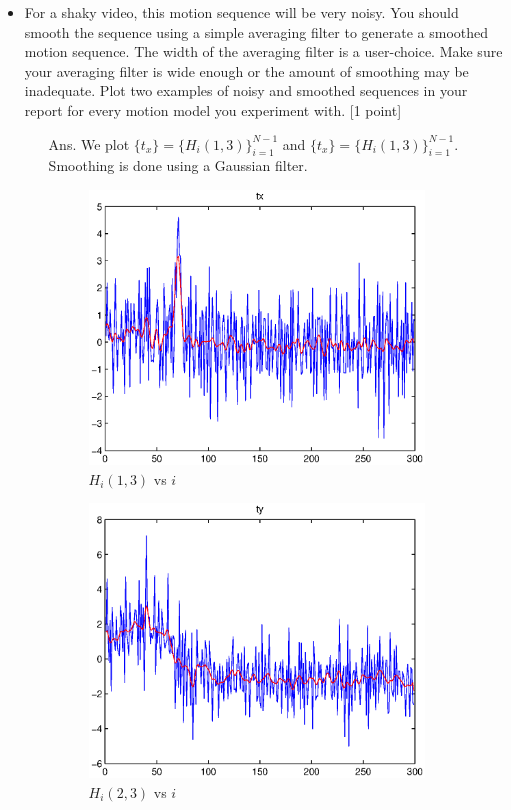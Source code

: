 \documentclass[11pt]{article}
\begin{document}
\begin{enumerate}
\begin{itemize}
\item For a shaky video, this motion sequence will be very noisy. You should smooth the sequence using a simple averaging filter to generate a smoothed motion sequence. The width of the averaging filter is a user-choice. Make sure your averaging filter is wide enough or the amount of smoothing may be inadequate. Plot two examples of noisy and smoothed sequences in your report for every motion model you experiment with. \textsf{[1 point]}
\begin{itemize}
	\item[Ans.] 
		We plot $\{t_x\} = \{H_i(1,3)\}_{i=1}^{N-1}$ and   $\{t_x\} = \{H_i(1,3)\}_{i=1}^{N-1}$. Smoothing is done using a Gaussian filter.
		\begin{figure}[h]
			\centering
			\includegraphics [width=3.5in]{tx.eps}
			\caption{ $H_i(1,3)$ vs $i$}
		\end{figure}
		\begin{figure}[h]
			\centering
			\includegraphics [width=3.5in]{ty.eps}
			\caption{ $H_i(2,3)$ vs $i$}
		\end{figure}
\end{itemize}




\end{itemize}
\end{enumerate}
\end{document}
